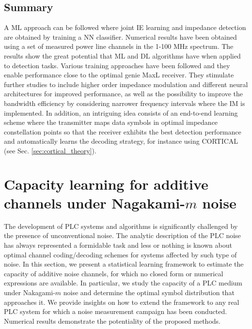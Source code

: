 \subsection{Summary}
A ML approach can be followed where joint IE learning and impedance detection are obtained by training a NN classifier. Numerical results have been obtained using a set of measured power line channels in the 1-100 MHz spectrum.
The results show the great potential that ML and DL algorithms have when applied to detection tasks. Various training approaches have been followed and they enable performance close to the optimal genie MaxL receiver. They stimulate further studies to include higher order impedance modulation and different neural architectures for improved performance, as well as the possibility to improve the bandwidth efficiency by considering narrower frequency intervals where the IM is implemented. In addition, an intriguing idea consists of an end-to-end learning scheme where the transmitter maps data symbols in optimal impedance constellation points so that the receiver exhibits the best detection performance and automatically learns the decoding strategy, for instance using CORTICAL (see Sec. \ref{sec:cortical_theory}).
  
\section{Capacity learning for additive channels under Nagakami-$m$ noise}
\label{sec:plc_nakagami}
The development of PLC systems and algorithms is significantly challenged by the presence of unconventional noise. The analytic description of the PLC noise has always represented a formidable task and less or nothing is known about optimal channel coding/decoding schemes for systems affected by such type of noise. 
In this section, we present a statistical learning framework to estimate the capacity of additive noise channels, for which no closed form or numerical expressions are available. In particular, we study the capacity of a PLC medium under Nakagami-$m$ noise and determine the optimal symbol distribution that approaches it. We provide insights on how to extend the framework to any real PLC system for which a noise measurement campaign has been conducted. Numerical results demonstrate the potentiality of the proposed methods.


